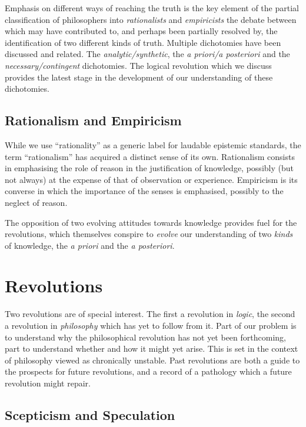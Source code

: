 Emphasis on different ways of reaching the truth is the key element of the partial classification of philosophers into {\it rationalists} and {\it empiricists} the debate between which may have contributed to, and perhaps been partially resolved by, the identification of two different kinds of truth.
Multiple dichotomies have been discussed and related.
The {\it analytic/synthetic}, the {\it a priori/a posteriori} and the {\it necessary/contingent} dichotomies.
The logical revolution which we discuss provides the latest stage in the development of our understanding of these dichotomies.

\subsection{Rationalism and Empiricism}


While we use ``rationality'' as a generic label for laudable epistemic standards, the term ``rationalism'' has acquired a distinct sense of its own.
Rationalism consists in emphasising the role of reason in the justification of knowledge, possibly (but not always) at the expense of that of observation or experience.
Empiricism is its converse in which the importance of the senses is emphasised, possibly to the neglect of reason.

The opposition of two evolving attitudes towards knowledge provides fuel for the revolutions, which themselves conspire to {\it evolve} our understanding of two {\it kinds} of knowledge, the {\it a priori} and the {\it a posteriori}.


\section{Revolutions}

Two revolutions are of special interest.
The first a revolution in {\it logic}, the second a revolution in {\it philosophy} which has yet to follow from it.
Part of our problem is to understand why the philosophical revolution has not yet been forthcoming, part to understand whether and how it might yet arise.
This is set in the context of philosophy viewed as chronically unstable.
Past revolutions are both a guide to the prospects for future revolutions, and a record of a pathology which a future revolution might repair.

\subsection{Scepticism and Speculation}

